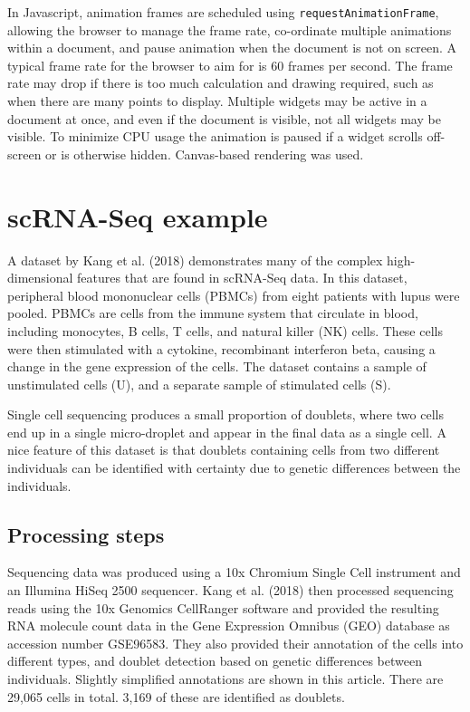 In Javascript, animation frames are scheduled using \texttt{requestAnimationFrame}, allowing the browser to manage the frame rate, co-ordinate multiple animations within a document, and pause animation when the document is not on screen. A typical frame rate for the browser to aim for is 60 frames per second. The frame rate may drop if there is too much calculation and drawing required, such as when there are many points to display. Multiple widgets may be active in a document at once, and even if the document is visible, not all widgets may be visible. To minimize CPU usage the animation is paused if a widget scrolls off-screen or is otherwise hidden. Canvas-based rendering was used.

\hypertarget{scrna-seq-example}{%
\section{scRNA-Seq example}\label{scrna-seq-example}}

A dataset by Kang et al. (2018) demonstrates many of the complex high-dimensional features that are found in scRNA-Seq data. In this dataset, peripheral blood mononuclear cells (PBMCs) from eight patients with lupus were pooled. PBMCs are cells from the immune system that circulate in blood, including monocytes, B cells, T cells, and natural killer (NK) cells. These cells were then stimulated with a cytokine, recombinant interferon beta, causing a change in the gene expression of the cells. The dataset contains a sample of unstimulated cells (U), and a separate sample of stimulated cells (S).

Single cell sequencing produces a small proportion of doublets, where two cells end up in a single micro-droplet and appear in the final data as a single cell. A nice feature of this dataset is that doublets containing cells from two different individuals can be identified with certainty due to genetic differences between the individuals.

\hypertarget{processing-steps}{%
\subsection{Processing steps}\label{processing-steps}}

Sequencing data was produced using a 10x Chromium Single Cell instrument and an Illumina HiSeq 2500 sequencer. Kang et al. (2018) then processed sequencing reads using the 10x Genomics CellRanger software and provided the resulting RNA molecule count data in the Gene Expression Omnibus (GEO) database as accession number GSE96583. They also provided their annotation of the cells into different types, and doublet detection based on genetic differences between individuals. Slightly simplified annotations are shown in this article. There are 29,065 cells in total. 3,169 of these are identified as doublets.

